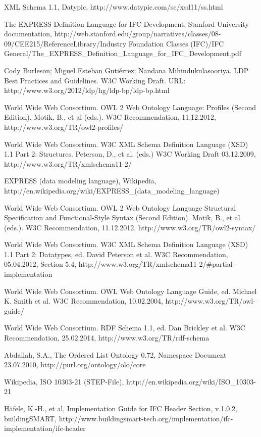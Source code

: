 %
%


\begin{thebibliography}{}

XML Schema 1.1, Datypic, http://www.datypic.com/sc/xsd11/ss.html

The EXPRESS Definition Language for IFC Development, Stanford University documentation,
http://web.stanford.edu/group/narratives/classes/08-09/CEE215/ReferenceLibrary/Industry Foundation Classes (IFC)/IFC General/The\_EXPRESS\_Definition\_Language\_for\_IFC\_Development.pdf

Cody Burleson; Miguel Esteban Gutiérrez; Nandana Mihindukulasooriya. LDP Best Practices and Guidelines. W3C Working Draft. URL: http://www.w3.org/2012/ldp/hg/ldp-bp/ldp-bp.html

World Wide Web Consortium. OWL 2 Web Ontology Language: Profiles (Second Edition), Motik, B., et al (eds.). W3C Recommendation, 11.12.2012, http://www.w3.org/TR/owl2-profiles/

World Wide Web Consortium. W3C XML Schema Definition Language (XSD) 1.1 Part 2: Structures.  Peterson, D., et al. (eds.) W3C Working Draft 03.12.2009, http://www.w3.org/TR/xmlschema11-2/

EXPRESS (data modeling language), Wikipedia, http://en.wikipedia.org/wiki/EXPRESS\_(data\_modeling\_language)

World Wide Web Consortium. OWL 2 Web Ontology Language 
Structural Specification and Functional-Style Syntax (Second Edition). Motik, B., et al (eds.). W3C Recommendation, 11.12.2012, http://www.w3.org/TR/owl2-syntax/

World Wide Web Consortium. W3C XML Schema Definition Language (XSD) 1.1 Part 2: Datatypes, ed. David Peterson et al. W3C Recommendation, 05.04.2012, Section 5.4, http://www.w3.org/TR/xmlschema11-2/#partial-implementation 

World Wide Web Consortium. OWL Web Ontology Language Guide, ed. Michael K. Smith et al. W3C Recommendation, 10.02.2004, http://www.w3.org/TR/owl-guide/

World Wide Web Consortium. RDF Schema 1.1, ed. Dan Brickley et al. W3C Recommendation, 25.02.2014, http://www.w3.org/TR/rdf-schema

Abdallah, S.A., The Ordered List Ontology 0.72, Namespace Document 23.07.2010, http://purl.org/ontology/olo/core

Wikipedia, ISO 10303-21 (STEP-File), http://en.wikipedia.org/wiki/ISO\_10303-21

H\"afele, K.-H., et al, Implementation Guide for IFC Header Section, v.1.0.2, buildingSMART, http://www.buildingsmart-tech.org/implementation/ifc-implementation/ifc-header

\end{thebibliography}
